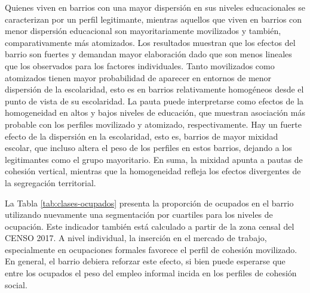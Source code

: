 \documentclass[
  12pt,
]{book}
\begin{document}
Quienes viven en barrios con una mayor dispersión en sus niveles educacionales se caracterizan por un perfil legitimante, mientras aquellos que viven en barrios con menor dispersión educacional son mayoritariamente movilizados y también, comparativamente más atomizados. Los resultados muestran que los efectos del barrio son fuertes y demandan mayor elaboración dado que son menos lineales que los observados para los factores individuales. Tanto movilizados como atomizados tienen mayor probabilidad de aparecer en entornos de menor dispersión de la escolaridad, esto es en barrios relativamente homogéneos desde el punto de vista de su escolaridad. La pauta puede interpretarse como efectos de la homogeneidad en altos y bajos niveles de educación, que muestran asociación más probable con los perfiles movilizado y atomizado, respectivamente. Hay un fuerte efecto de la dispersión en la escolaridad, esto es, barrios de mayor mixidad escolar, que incluso altera el peso de los perfiles en estos barrios, dejando a los legitimantes como el grupo mayoritario. En suma, la mixidad apunta a pautas de cohesión vertical, mientras que la homogeneidad refleja los efectos divergentes de la segregación territorial.

La Tabla \ref{tab:clases-ocupados} presenta la proporción de ocupados en el barrio utilizando nuevamente una segmentación por cuartiles para los niveles de ocupación. Este indicador también está calculado a partir de la zona censal del CENSO 2017. A nivel individual, la inserción en el mercado de trabajo, especialmente en ocupaciones formales favorece el perfil de cohesión movilizado. En general, el barrio debiera reforzar este efecto, si bien puede esperarse que entre los ocupados el peso del empleo informal incida en los perfiles de cohesión social.

\begin{table}

\caption{\label{tab:clases-ocupados}Efecto de la proporción de trabajadores ocupados sobre los perfiles de cohesion social}
\centering
{}
\end{table}
\end{document}
